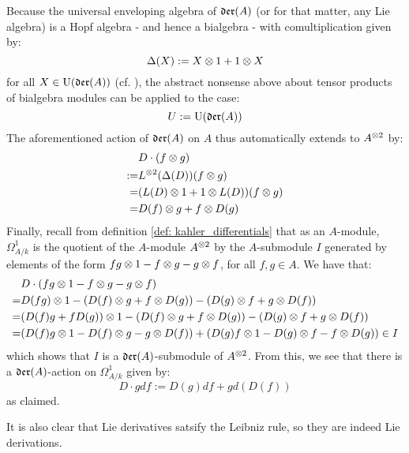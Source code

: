 \begin{example}
            Because the universal enveloping algebra of $\mathfrak{der}(A)$ (or for that matter, any Lie algebra) is a Hopf algebra - and hence a bialgebra - with comultiplication given by:
                $$\Delta(X) := X \tensor 1 + 1 \tensor X$$
            for all $X \in \mathrm{U}(\mathfrak{der}(A))$ (cf. \cite[Section III.3]{kassel_quantum_groups}), the abstract nonsense above about tensor products of bialgebra modules can be applied to the case:
                $$U := \mathrm{U}(\mathfrak{der}(A))$$
            The aforementioned action of $\mathfrak{der}(A)$ on $A$ thus automatically extends to $A^{\tensor 2}$ by:
                $$
                    \begin{aligned}
                        & D \cdot ( f \tensor g )
                        \\
                        := & L^{\tensor 2}( \Delta(D) )( f \tensor g )
                        \\
                        = & ( L(D) \tensor 1 + 1 \tensor L(D) )(f \tensor g)
                        \\
                        = & D(f) \tensor g + f \tensor D(g)
                    \end{aligned}
                $$
            Finally, recall from definition \ref{def: kahler_differentials} that as an $A$-module, $\Omega^1_{A/k}$ is the quotient of the $A$-module $A^{\tensor 2}$ by the $A$-submodule $I$ generated by elements of the form $fg \tensor 1 - f \tensor g - g \tensor f$, for all $f, g \in A$. We have that:
                $$
                    \begin{aligned}
                        & D \cdot ( fg \tensor 1 - f \tensor g - g \tensor f )
                        \\
                        = & D(fg) \tensor 1 - ( D(f) \tensor g + f \tensor D(g) ) - ( D(g) \tensor f + g \tensor D(f) )
                        \\
                        = & (D(f) g + f D(g)) \tensor 1 - ( D(f) \tensor g + f \tensor D(g) ) - ( D(g) \tensor f + g \tensor D(f) )
                        \\
                        = & ( D(f) g \tensor 1 - D(f) \tensor g - g \tensor D(f) ) + ( D(g) f \tensor 1 - D(g) \tensor f - f \tensor D(g) ) 
                        \in I
                    \end{aligned}
                $$
            which shows that $I$ is a $\mathfrak{der}(A)$-submodule of $A^{\tensor 2}$. From this, we see that there is a $\mathfrak{der}(A)$-action on $\Omega^1_{A/k}$ given by:
                $$D \cdot g df := D(g) df + g d(D(f))$$
            as claimed.

            It is also clear that Lie derivatives satsify the Leibniz rule, so they are indeed Lie derivations.
        \end{example}
